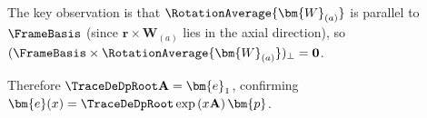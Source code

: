 \begin{Details}
The key observation is that $\RotationAverage{\bm{W}_{(a)}}$ is parallel to 
$\FrameBasis$ (since $\bm{r} \times \bm{W}_{(a)}$ lies in the axial direction), 
so $(\FrameBasis \times \RotationAverage{\bm{W}_{(a)}})_\perp = \mathbf{0}$.

Therefore $\TraceDeDpRoot\mathbf{A} = \bm{e}_1$, confirming 
$\bm{e}(x) = \TraceDeDpRoot \exp\left(x\mathbf{A}\right)\bm{p}$.
\end{Details}


\clearpage
% 
% 
